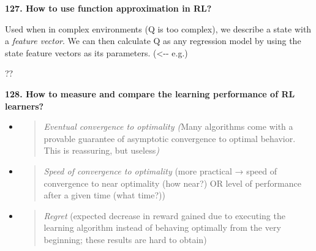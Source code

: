 \textbf{127. How to use function approximation in RL?}

Used when in complex environments (Q is too complex), we describe a
state with a \emph{feature vector}. We can then calculate Q as any
regression model by using the state feature vectors as its parameters.
(\textless-\/- e.g.)

??

\textbf{128. How to measure and compare the learning performance of RL
learners?}

\begin{itemize}
\item
  \begin{quote}
  \textit{Eventual convergence to optimality (}Many algorithms come
  with a provable guarantee of asymptotic convergence to optimal
  behavior. This is reassuring, but useless\textit{)}
  \end{quote}
\item
  \begin{quote}
  \textit{Speed of convergence to optimality} (more practical → speed
  of convergence to near optimality (how near?) OR level of performance
  after a given time (what time?))
  \end{quote}
\item
  \begin{quote}
  \textit{Regret} (expected decrease in reward gained due to
  executing the learning algorithm instead of behaving optimally from
  the very beginning; these results are hard to obtain)
  \end{quote}
\end{itemize}
